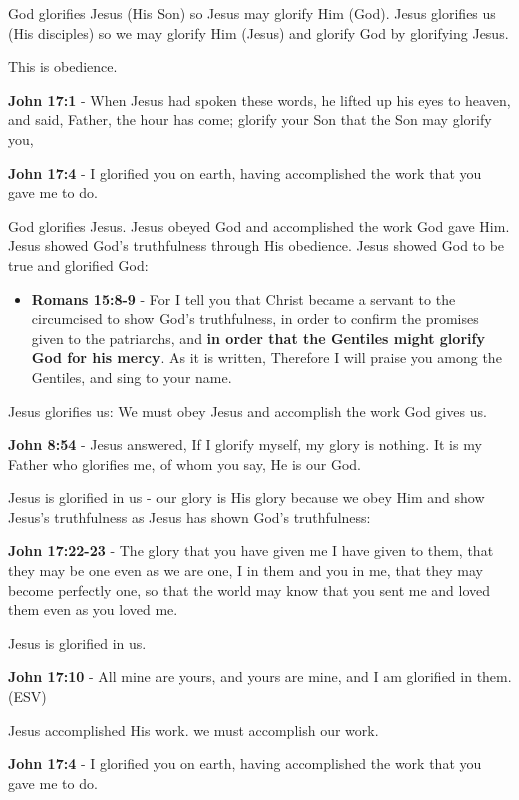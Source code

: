 \documentclass[11pt]{article}
\begin{document}
God glorifies Jesus (His Son) so Jesus may glorify Him (God).
Jesus glorifies us (His disciples) so we may glorify Him (Jesus) and glorify God by glorifying Jesus.

This is obedience.

\textbf{John 17:1} - When Jesus had spoken these words, he lifted up his eyes to heaven, and said, Father, the hour has come; glorify your Son that the Son may glorify you,

\textbf{John 17:4} - I glorified you on earth, having accomplished the work that you gave me to do.

God glorifies Jesus.
Jesus obeyed God and accomplished the work God gave Him.
Jesus showed God's truthfulness through His obedience. Jesus showed God to be true and glorified God:
\begin{itemize}
\item \textbf{Romans 15:8-9} - For I tell you that Christ became a servant to the circumcised to show God's truthfulness, in order to confirm the promises given to the patriarchs, and \textbf{in order that the Gentiles might glorify God for his mercy}. As it is written, Therefore I will praise you among the Gentiles, and sing to your name.
\end{itemize}

Jesus glorifies us:
We must obey Jesus and accomplish the work God gives us.

\textbf{John 8:54} - Jesus answered, If I glorify myself, my glory is nothing. It is my Father who glorifies me, of whom you say, He is our God.

Jesus is glorified in us - our glory is His glory because we obey Him and show Jesus's truthfulness as Jesus has shown God's truthfulness:

\textbf{John 17:22-23} - The glory that you have given me I have given to them, that they may be one even as we are one, I in them and you in me, that they may become perfectly one, so that the world may know that you sent me and loved them even as you loved me.

Jesus is glorified in us.

\textbf{John 17:10} - All mine are yours, and yours are mine, and I am glorified in them. (ESV)

Jesus accomplished His work.
we must accomplish our work.

\textbf{John 17:4} - I glorified you on earth, having accomplished the work that you gave me to do.
\end{document}
